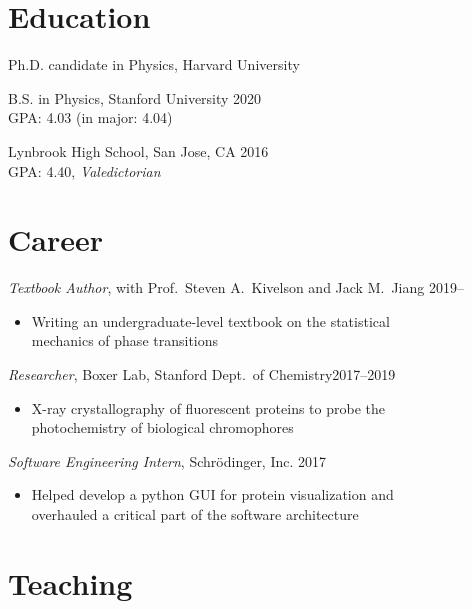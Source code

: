 \documentclass[margin,11pt]{res}
\newenvironment{myitemize}
{ \vspace{-1.5\topsep} \begin{itemize} \setlength\itemsep{0em}}
{ \end{itemize} \vspace{-1.0\topsep}}
\begin{document}
\address{jeffjar@alumni.stanford.edu --- \url{https://jeffjar.me}}

\begin{resume}

\section{Education}

Ph.D. candidate in Physics, Harvard University

B.S. in Physics, Stanford University \hfill 2020 \\
GPA: 4.03 (in major: 4.04)
 
Lynbrook High School, San Jose, CA \hfill 2016 \\
GPA: 4.40, \textit{Valedictorian}

\section{Career}

\textit{Textbook Author}, with Prof.\ Steven A.\ Kivelson and Jack M.\ Jiang  \hfill 2019--\\
\begin{myitemize}
    \item Writing an undergraduate-level textbook on the statistical\\
        mechanics of phase transitions
\end{myitemize}

\textit{Researcher}, Boxer Lab, Stanford Dept.\ of Chemistry\hfill 2017--2019 \\
\begin{myitemize}
    \item X-ray crystallography of fluorescent proteins to probe the\\ photochemistry of biological chromophores
\end{myitemize}

\textit{Software Engineering Intern}, Schr{\"o}dinger, Inc. \hfill 2017 \\
\begin{myitemize}
    \item Helped develop a python GUI for protein visualization and \\overhauled a critical part of the software architecture
\end{myitemize}

\section{Teaching}


\end{resume}
\end{document}
